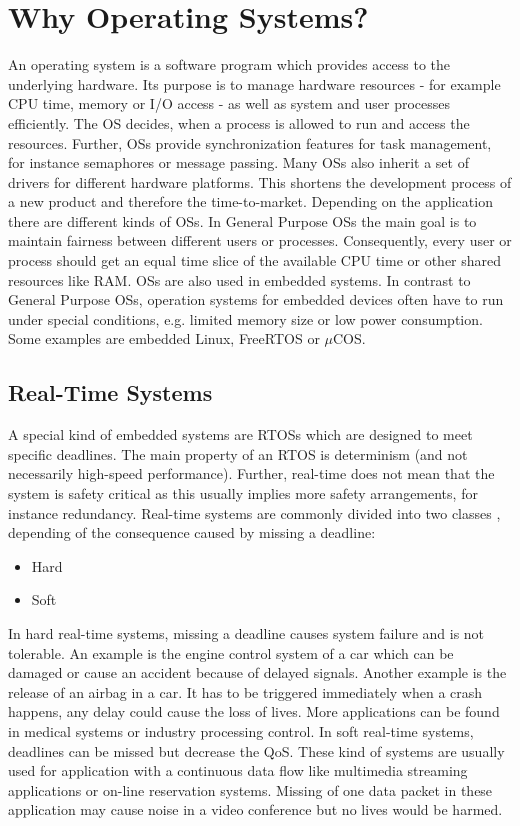 \section{Why Operating Systems?}
An operating system is a software program which provides access to the underlying hardware. 
Its purpose is to manage hardware resources - for example \ac{CPU} time, memory or \ac{I/O} access - as well as system and user processes efficiently. 
The \ac{OS} decides, when a process is allowed to run and access the resources.
Further, \acp{OS} provide synchronization features for task management, for instance semaphores or message passing.
Many \acp{OS} also inherit a set of drivers for different hardware platforms.
This shortens the development process of a new product and therefore the time-to-market.
Depending on the application there are different kinds of \acp{OS}. 
In General Purpose \acp{OS} the main goal is to maintain fairness between different users or processes. 
Consequently, every user or process should get an equal time slice of the available \ac{CPU} time or other shared resources like \ac{RAM}. 
\acp{OS} are also used in embedded systems. 
In contrast to General Purpose \acp{OS}, operation systems for embedded devices often have to run under special conditions, e.g. limited memory size or low power consumption. 
Some examples are embedded Linux, FreeRTOS or $\mu$COS.

\subsection{Real-Time Systems}
A special kind of embedded systems are \acp{RTOS} which are designed to meet specific deadlines. 
The main property of an \ac{RTOS} is determinism (and not necessarily high-speed performance).  
Further, real-time does not mean that the system is safety critical as this usually implies more safety arrangements, for instance redundancy.
Real-time systems are commonly divided into two classes \cite{stromblad:elfrtoemd}, depending of the consequence caused by missing a deadline:
\begin{itemize}
	\item Hard
	\item Soft
\end{itemize}
In hard real-time systems, missing a deadline causes system failure and is not tolerable.  
An example is the engine control system of a car which can be damaged or cause an accident because of delayed signals.
Another example is the release of an airbag in a car. 
It has to be triggered immediately when a crash happens, any delay could cause the loss of lives. 
More applications can be found in medical systems or industry processing control.  
In soft real-time systems, deadlines can be missed but decrease the \ac{QoS}. 
These kind of systems are usually used for application with a continuous data flow like multimedia streaming applications or on-line reservation systems.
Missing of one data packet in these application may cause noise in a video conference but no lives would be harmed.

